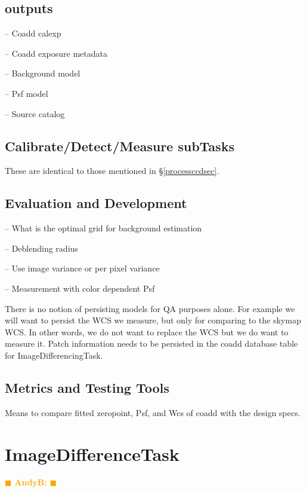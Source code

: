 \documentclass[prd, nofootinbib, floatfix, 11pt,tightenlines,times]{article}
\newcommand{\becker} { \textcolor{orange} {
\ensuremath{\blacksquare} {\bf AndyB:}  
\ensuremath{\blacksquare} } }
\begin{document}
\subsection{outputs}

-- Coadd calexp

-- Coadd exposure metadata

-- Background model

-- Psf model

-- Source catalog

\subsection{Calibrate/Detect/Measure subTasks}
These are identical to those mentioned in \S \ref{processccdsec}.

\subsection{Evaluation and Development}

-- What is the optimal grid for background estimation

-- Deblending radius

-- Use image variance or per pixel variance

-- Measurement with color dependent Psf

There is no notion of persisting models for QA purposes alone.  For example we will want to persist
the WCS we measure, but only for comparing to the skymap WCS.  In other words, we do not want to replace the 
WCS but we do want to measure it.  Patch information needs to be persisted in the coadd database table
for ImageDifferencingTask.

\subsection{Metrics and Testing Tools}
Means to compare fitted zeropoint, Psf, and Wcs of coadd with the
design specs.


\clearpage 
\section{ImageDifferenceTask \label{sec-imagedifftask}} \becker


\end{document}
